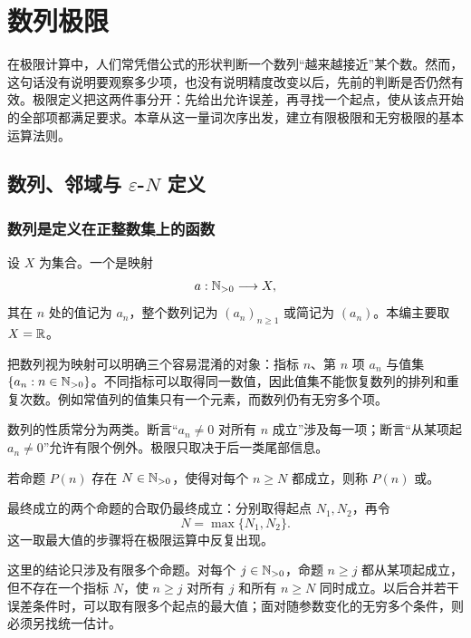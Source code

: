 \chapter{数列极限}
\label{chap:sequence-limits}
\label{chap:sequence-limit-definition}
\label{chap:sequence-error-control}
\label{chap:sequence-limit-properties}

在极限计算中，人们常凭借公式的形状判断一个数列“越来越接近”某个数。然而，这句话没有说明要观察多少项，也没有说明精度改变以后，先前的判断是否仍然有效。极限定义把这两件事分开：先给出允许误差，再寻找一个起点，使从该点开始的全部项都满足要求。本章从这一量词次序出发，建立有限极限和无穷极限的基本运算法则。

\section{数列、邻域与 \texorpdfstring{\(\varepsilon\)-\(N\)}{epsilon-N} 定义}

\subsection{数列是定义在正整数集上的函数}

\begin{definition}
设 \(X\) 为集合。一个是映射
\[
 a:\mathbb{N}_{>0}\longrightarrow X,
\]
其在 \(n\) 处的值记为 \(a_n\)，整个数列记为 \((a_n)_{n\ge1}\) 或简记为 \((a_n)\)。本编主要取 \(X=\mathbb{R}\)。
\end{definition}

把数列视为映射可以明确三个容易混淆的对象：指标 \(n\)、第 \(n\) 项 \(a_n\) 与值集 \(\{a_n:n\in\mathbb{N}_{>0}\}\)。不同指标可以取得同一数值，因此值集不能恢复数列的排列和重复次数。例如常值列的值集只有一个元素，而数列仍有无穷多个项。

数列的性质常分为两类。断言“\(a_n\ne0\) 对所有 \(n\) 成立”涉及每一项；断言“从某项起 \(a_n\ne0\)”允许有限个例外。极限只取决于后一类尾部信息。

\begin{definition}
若命题 \(P(n)\) 存在 \(N\in\mathbb{N}_{>0}\)，使得对每个 \(n\ge N\) 都成立，则称 \(P(n)\) 或。
\end{definition}

最终成立的两个命题的合取仍最终成立：分别取得起点 \(N_1,N_2\)，再令
\[
 N=\max\{N_1,N_2\}.
\]
这一取最大值的步骤将在极限运算中反复出现。

这里的结论只涉及有限多个命题。对每个 \(j\in\mathbb{N}_{>0}\)，命题
\(n\ge j\) 都从某项起成立，但不存在一个指标 \(N\)，使 \(n\ge j\)
对所有 \(j\) 和所有 \(n\ge N\) 同时成立。以后合并若干误差条件时，可以取有限多个起点的最大值；面对随参数变化的无穷多个条件，则必须另找统一估计。

